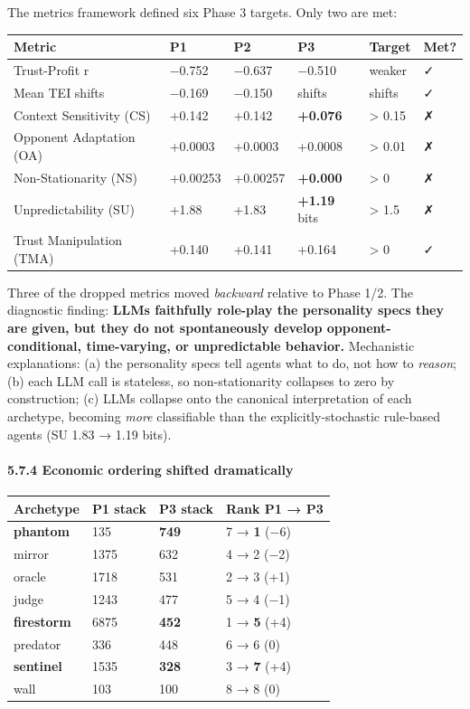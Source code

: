 \documentclass[
]{article}
\begin{document}
The metrics framework defined six Phase 3 targets. Only two are met:

\begin{longtable}[]{@{}llllll@{}}
\toprule\noalign{}
Metric & P1 & P2 & P3 & Target & Met? \\
\midrule\noalign{}
\endhead
\bottomrule\noalign{}
\endlastfoot
Trust-Profit r & −0.752 & −0.637 & −0.510 & weaker & ✓ \\
Mean TEI shifts & −0.169 & −0.150 & shifts & shifts & ✓ \\
Context Sensitivity (CS) & +0.142 & +0.142 & \textbf{+0.076} &
\textgreater{} 0.15 & ✗ \\
Opponent Adaptation (OA) & +0.0003 & +0.0003 & +0.0008 & \textgreater{}
0.01 & ✗ \\
Non-Stationarity (NS) & +0.00253 & +0.00257 & \textbf{+0.000} &
\textgreater{} 0 & ✗ \\
Unpredictability (SU) & +1.88 & +1.83 & \textbf{+1.19} bits &
\textgreater{} 1.5 & ✗ \\
Trust Manipulation (TMA) & +0.140 & +0.141 & +0.164 & \textgreater{} 0 &
✓ \\
\end{longtable}

Three of the dropped metrics moved \emph{backward} relative to Phase
1/2. The diagnostic finding: \textbf{LLMs faithfully role-play the
personality specs they are given, but they do not spontaneously develop
opponent-conditional, time-varying, or unpredictable behavior.}
Mechanistic explanations: (a) the personality specs tell agents what to
do, not how to \emph{reason}; (b) each LLM call is stateless, so
non-stationarity collapses to zero by construction; (c) LLMs collapse
onto the canonical interpretation of each archetype, becoming
\emph{more} classifiable than the explicitly-stochastic rule-based
agents (SU 1.83 → 1.19 bits).

\hypertarget{economic-ordering-shifted-dramatically}{%
\paragraph{5.7.4 Economic ordering shifted
dramatically}\label{economic-ordering-shifted-dramatically}}

\begin{longtable}[]{@{}llll@{}}
\toprule\noalign{}
Archetype & P1 stack & P3 stack & Rank P1 → P3 \\
\midrule\noalign{}
\endhead
\bottomrule\noalign{}
\endlastfoot
\textbf{phantom} & 135 & \textbf{749} & 7 → \textbf{1} (−6) \\
mirror & 1375 & 632 & 4 → 2 (−2) \\
oracle & 1718 & 531 & 2 → 3 (+1) \\
judge & 1243 & 477 & 5 → 4 (−1) \\
\textbf{firestorm} & 6875 & \textbf{452} & 1 → \textbf{5} (+4) \\
predator & 336 & 448 & 6 → 6 (0) \\
\textbf{sentinel} & 1535 & \textbf{328} & 3 → \textbf{7} (+4) \\
wall & 103 & 100 & 8 → 8 (0) \\
\end{longtable}
\end{document}
